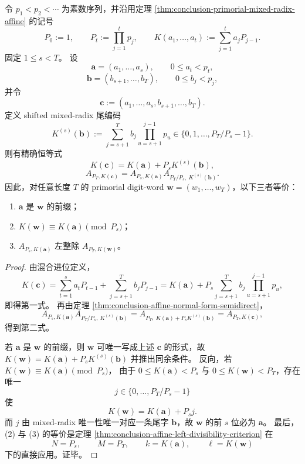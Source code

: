 \begin{theorem}\label{thm:conclusion-primorial-prefix-arithmetic-matrix-criterion}
令 \(p_1<p_2<\cdots\) 为素数序列，并沿用定理 \ref{thm:conclusion-primorial-mixed-radix-affine} 的记号
\[
P_0:=1,\qquad P_t:=\prod_{j=1}^{t}p_j,\qquad
K(a_1,\dots,a_t):=\sum_{j=1}^{t}a_jP_{j-1}.
\]
固定 \(1\le s<T\)。
设
\[
\mathbf a=(a_1,\dots,a_s),\qquad 0\le a_t<p_t,
\]
\[
\mathbf b=(b_{s+1},\dots,b_T),\qquad 0\le b_j<p_j,
\]
并令
\[
\mathbf c:=(a_1,\dots,a_s,b_{s+1},\dots,b_T).
\]
定义 shifted mixed-radix 尾编码
\[
K^{(s)}(\mathbf b):=
\sum_{j=s+1}^{T}b_j\prod_{u=s+1}^{j-1}p_u
\in \{0,1,\dots,P_T/P_s-1\}.
\]
则有精确恒等式
\[
K(\mathbf c)=K(\mathbf a)+P_sK^{(s)}(\mathbf b),
\]
\[
A_{P_T,K(\mathbf c)}
=
A_{P_s,K(\mathbf a)}A_{P_T/P_s,\ K^{(s)}(\mathbf b)}.
\]
因此，对任意长度 \(T\) 的 primorial digit-word \(\mathbf w=(w_1,\dots,w_T)\)，以下三者等价：
\begin{enumerate}
  \item \(\mathbf a\) 是 \(\mathbf w\) 的前缀；
  \item \(K(\mathbf w)\equiv K(\mathbf a)\pmod{P_s}\)；
  \item \(A_{P_s,K(\mathbf a)}\) 左整除 \(A_{P_T,K(\mathbf w)}\)。
\end{enumerate}
\end{theorem}
\begin{proof}
由混合进位定义，
\[
K(\mathbf c)
=
\sum_{t=1}^{s}a_tP_{t-1}
+
\sum_{j=s+1}^{T}b_jP_{j-1}
=
K(\mathbf a)+P_s\sum_{j=s+1}^{T}b_j\prod_{u=s+1}^{j-1}p_u,
\]
即得第一式。
再由定理 \ref{thm:conclusion-affine-normal-form-semidirect}，
\[
A_{P_s,K(\mathbf a)}A_{P_T/P_s,\ K^{(s)}(\mathbf b)}
=
A_{P_T,\ K(\mathbf a)+P_sK^{(s)}(\mathbf b)}
=
A_{P_T,K(\mathbf c)},
\]
得到第二式。

若 \(\mathbf a\) 是 \(\mathbf w\) 的前缀，则 \(\mathbf w\) 可唯一写成上述 \(\mathbf c\) 的形式，故
\(
K(\mathbf w)=K(\mathbf a)+P_sK^{(s)}(\mathbf b)
\)
并推出同余条件。
反向，若
\(
K(\mathbf w)\equiv K(\mathbf a)\pmod{P_s}
\)，
由于 \(0\le K(\mathbf a)<P_s\) 与 \(0\le K(\mathbf w)<P_T\)，存在唯一
\[
j\in\{0,\dots,P_T/P_s-1\}
\]
使
\[
K(\mathbf w)=K(\mathbf a)+P_sj.
\]
而 \(j\) 由 mixed-radix 唯一性唯一对应一条尾字 \(\mathbf b\)，故 \(\mathbf w\) 的前 \(s\) 位必为 \(\mathbf a\)。
最后，(2) 与 (3) 的等价是定理 \ref{thm:conclusion-affine-left-divisibility-criterion} 在
\[
N=P_s,\qquad M=P_T,\qquad k=K(\mathbf a),\qquad \ell=K(\mathbf w)
\]
下的直接应用。证毕。
\end{proof}

